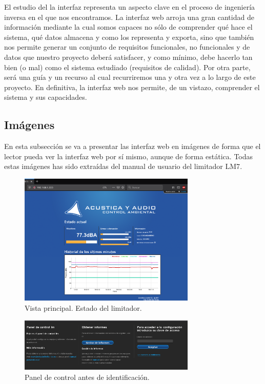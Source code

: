 El estudio del la interfaz representa un aspecto clave en el proceso de ingeniería inversa en el que nos encontramos. La interfaz web arroja una gran cantidad de información mediante la cual somos capaces no sólo de comprender qué hace el sistema, qué datos almacena y como los representa y exporta, sino que también nos permite generar un conjunto de requisitos funcionales, no funcionales y de datos que nuestro proyecto deberá satisfacer, y como mínimo, debe hacerlo tan bien (o mal) como el sistema estudiado (requisitos de calidad). Por otra parte, será una guía y un recurso al cual recurriremos una y otra vez a lo largo de este proyecto. En definitiva, la interfaz web nos permite, de un vistazo, comprender el sistema y sus capacidades.

\subsection{Imágenes}

En esta subsección se va a presentar las interfaz web en imágenes de forma que el lector pueda ver la interfaz web por sí mismo, aunque de forma estática. Todas estas imágenes has sido extraídas del manual de usuario del limitador \acrshort{LM7}.

\begin{figure}[ht]
    \centering
    \includegraphics[width=0.75\textwidth]{imagenes/interfaz/Interfaz_0.png}
    \caption{Vista principal. Estado del limitador.}
\end{figure}

\begin{figure}[ht]
    \centering
    \includegraphics[width=0.75\textwidth]{imagenes/interfaz/Interfaz_1_menu.png}
    \caption{Panel de control antes de identificación.}
\end{figure}


